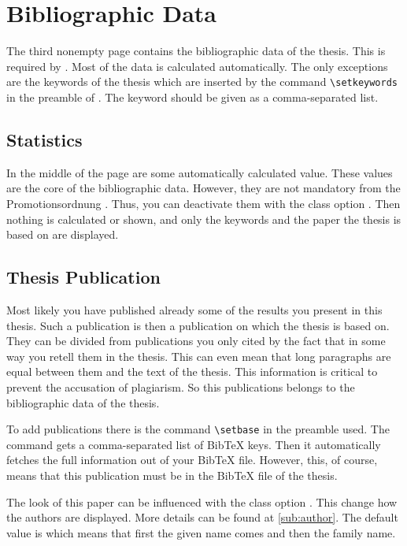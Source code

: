\section{Bibliographic Data}

The third nonempty page contains the bibliographic data of the thesis. This
is required by \citet{web:promotion}. Most of the data is calculated
automatically. The only exceptions are the keywords of the thesis which
are inserted by the command \verb!\setkeywords! in the preamble of
. The keyword should be given as a comma-separated list.

\subsection{Statistics}%
\label{sub:stats}

In the middle of the page are some automatically calculated value. These
values are the core of the bibliographic data. However, they are not mandatory
from the Promotionsordnung \citep{web:promotion}. Thus, you can deactivate
them with the class option .
Then nothing is calculated or shown, and only the keywords and the paper the
thesis is based on are displayed.

\subsection{Thesis Publication}%
\label{sub:baseon}

Most likely you have published already some of the results you present in this
thesis. Such a publication is then a publication on which the thesis is based
on. They can be divided from publications you only cited by the fact that in
some way you retell them in the thesis. This can even mean that long
paragraphs are equal between them and the text of the thesis.  This
information is critical to prevent the accusation of plagiarism. So this
publications belongs to the bibliographic data of the thesis.

To add publications there is the command \verb!\setbase! in the preamble used.
The command gets a comma-separated list of BibTeX keys. Then it automatically
fetches the full information out of your BibTeX file. However, this, of
course, means that this publication must be in the BibTeX file of the thesis.

The look of this paper can be influenced with the class option
. This change how the
authors are displayed. More details can be found at \autoref{sub:author}. The
default value is  which means that first the given name comes and then
the family name.

